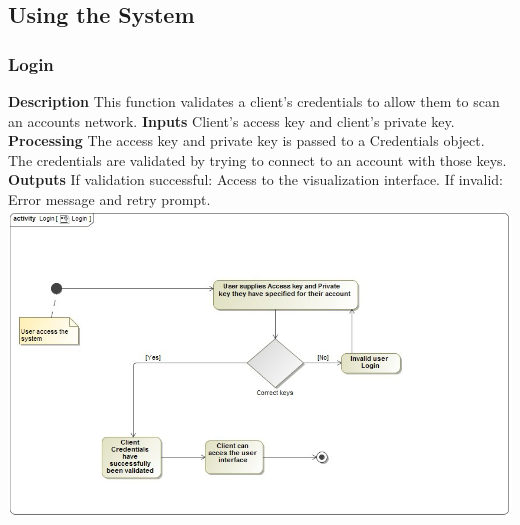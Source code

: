\documentclass[hidelinks,a4paper,12pt]{article}
\begin{document}
\subsection{Using the System}		
	\subsubsection{Login}
	\textbf{Description}
	\newline
	This function validates a client’s credentials to allow them to scan an accounts network.
	\textbf{Inputs}
	\newline
	Client’s access key and client’s private key.
	\newline
	\textbf{Processing}
	\newline
	The access key and private key is passed to a Credentials object. The credentials are validated by
	trying to connect to an account with those keys.
	\newline
	\textbf{Outputs}
	\newline
	If validation successful:
	\newline
	Access to the visualization interface.
	\newline
	If invalid:
	\newline
	Error message and retry prompt.
	\newline
	\includegraphics[width=1.00\textwidth]{./images/Login.png}\\[0.4cm] 
	\newpage	
\end{document}
